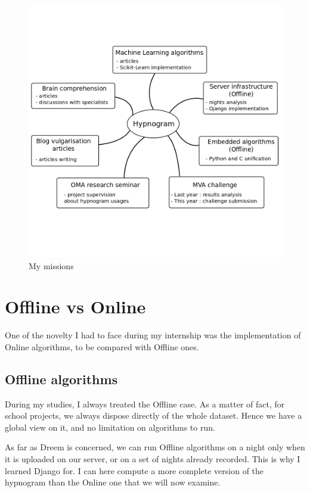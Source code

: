 \documentclass[12pt]{report}
\begin{document}
\begin{figure}[H]
\centering
\includegraphics[width=1\textwidth]{img/chap1/missions.png}
\caption{\label{fig:missions}My missions}
\end{figure}

\section{Offline vs Online} \label{chap:Offline vs Online}

One of the novelty I had to face during my internship was the implementation of Online algorithms, to be compared with Offline ones.

\subsection{Offline algorithms}

During my studies, I always treated the Offline case. As a matter of fact, for school projects, we always dispose directly of the whole dataset. Hence we have a global view on it, and no limitation on algorithms to run.

As far as Dreem is concerned, we can run Offline algorithms on a night only when it is uploaded on our server, or on a set of nights already recorded. This is why I learned Django for. I can here compute a more complete version of the hypnogram than the Online one that we will now examine.
\end{document}
